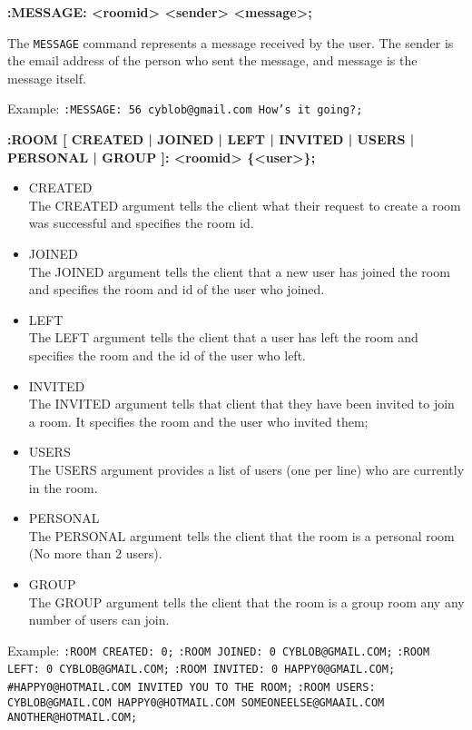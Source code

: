 {\bf :MESSAGE: <roomid> <sender> <message>;}

The \texttt{MESSAGE} command represents a message received by the user. The sender is the email address of the person who sent the message, and message is the message itself.

Example:
\texttt{:MESSAGE: 56 cyblob@gmail.com How’s it going?;}

{\bf :ROOM [ CREATED | JOINED | LEFT | INVITED | USERS | PERSONAL | GROUP ]: <roomid> \{<user>\};}

\begin{itemize}

\item{CREATED \\
The CREATED argument tells the client what their request to create a room was successful and specifies the room id.}

\item{JOINED \\
The JOINED argument tells the client that a new user has joined the room and specifies the room and id of the user who joined.}

\item{LEFT \\
The LEFT argument tells the client that a user has left the room and specifies the room and the id of the user who left.}

\item{INVITED \\
The INVITED argument tells that client that they have been invited to join a room. It specifies the room and the user who invited them;}

\item{USERS \\
The USERS argument provides a list of users (one per line) who are currently in the room.}

\item{PERSONAL \\
The PERSONAL argument tells the client that the room is a personal room (No more than 2 users).}

\item{GROUP \\
The GROUP argument tells the client that the room is a group room any any number of users can join.}
	
\end{itemize}

Example:
\texttt{:ROOM CREATED: 0;}
\texttt{:ROOM JOINED: 0 CYBLOB@GMAIL.COM;}
\texttt{:ROOM LEFT: 0 CYBLOB@GMAIL.COM;}
\texttt{:ROOM INVITED: 0 HAPPY0@GMAIL.COM; #HAPPY0@HOTMAIL.COM INVITED YOU TO THE ROOM;}
\texttt{:ROOM USERS: CYBLOB@GMAIL.COM HAPPY0@HOTMAIL.COM SOMEONEELSE@GMAAIL.COM ANOTHER@HOTMAIL.COM;}

